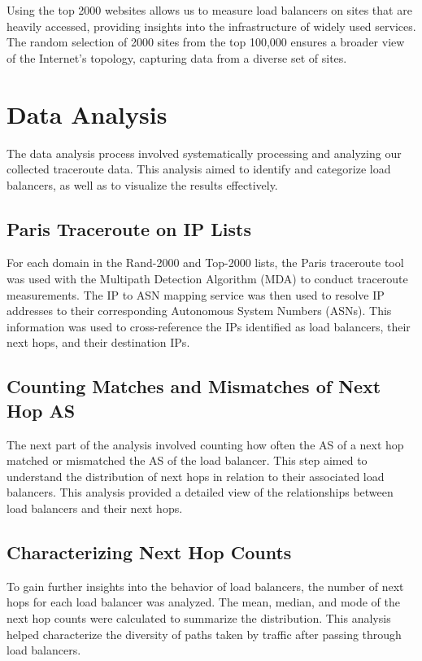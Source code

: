 \documentclass[12pt]{cwru_thesis}
\begin{document}
Using the top 2000 websites allows us to measure load balancers on sites that are heavily accessed, providing insights into the infrastructure of widely used services. The random selection of 2000 sites from the top 100,000 ensures a broader view of the Internet's topology, capturing data from a diverse set of sites.



\section{Data Analysis}

The data analysis process involved systematically processing and analyzing our collected traceroute data. This analysis aimed to identify and categorize load balancers, as well as to visualize the results effectively.

\subsection{Paris Traceroute on IP Lists}

For each domain in the Rand-2000 and Top-2000 lists, the Paris traceroute tool was used with the Multipath Detection Algorithm (MDA) to conduct traceroute measurements. The IP to ASN mapping service was then used to resolve IP addresses to their corresponding Autonomous System Numbers (ASNs). This information was used to cross-reference the IPs identified as load balancers, their next hops, and their destination IPs.

\subsection{Counting Matches and Mismatches of Next Hop AS}

The next part of the analysis involved counting how often the AS of a next hop matched or mismatched the AS of the load balancer. This step aimed to understand the distribution of next hops in relation to their associated load balancers. This analysis provided a detailed view of the relationships between load balancers and their next hops.

\subsection{Characterizing Next Hop Counts}

To gain further insights into the behavior of load balancers, the number of next hops for each load balancer was analyzed. The mean, median, and mode of the next hop counts were calculated to summarize the distribution. This analysis helped characterize the diversity of paths taken by traffic after passing through load balancers.
\end{document}
